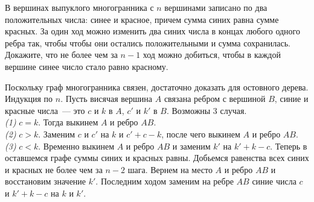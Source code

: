 \problem
В вершинах выпуклого многогранника с $n$ вершинами записано по два
положительных числа: синее и красное, причем сумма синих равна сумме красных.
За один ход можно изменить два синих числа в концах любого одного ребра так,
чтобы чтобы они остались положительными и сумма сохранилась.
Докажите, что не более чем за $n - 1$ ход можно добиться, чтобы в каждой
вершине синее число стало равно красному.

\solution
Поскольку граф многогранника связен, достаточно доказать для остовного дерева.
Индукция по $n$.
Пусть висячая вершина $A$ связана ребром с вершиной $B$,
синие и красные числа~--- это $c$ и $k$ в $A$, $c'$ и $k'$ в $B$.
Возможны 3 случая.
\\
\emph{(1)} $c = k$.
Тогда выкинем $A$ и ребро $A B$.
\\
\emph{(2)} $c > k$.
Заменим $c$ и $c'$ на $k$ и $c' + c - k$, после чего выкинем $A$ и ребро $AB$.
\\
\emph{(3)} $c < k$.
Временно выкинем $A$ и ребро $AB$ и заменим $k'$ на $k' + k - c$.
Теперь в оставшемся графе суммы синих и красных равны.
Добьемся равенства всех синих и красных не более чем за $n - 2$ шага.
Вернем на место $A$ и ребро $AB$ и восстановим значение $k'$.
Последним ходом заменим на ребре $AB$ синие числа $c$ и $k' + k - c$ на
$k$ и $k'$.

\endproblem
